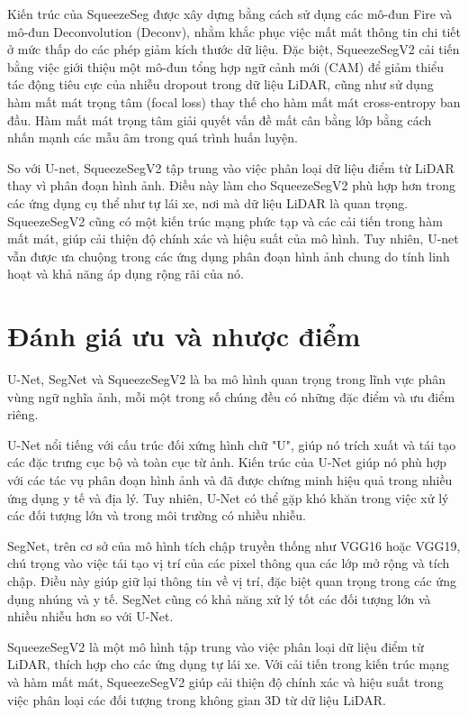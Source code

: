 Kiến trúc của SqueezeSeg được xây dựng bằng cách sử dụng các mô-đun Fire và mô-đun Deconvolution (Deconv), nhằm khắc phục việc mất mát thông tin chi tiết ở mức thấp do các phép giảm kích thước dữ liệu. Đặc biệt, SqueezeSegV2 cải tiến bằng việc giới thiệu một mô-đun tổng hợp ngữ cảnh mới (CAM) để giảm thiểu tác động tiêu cực của nhiễu dropout trong dữ liệu LiDAR, cũng như sử dụng hàm mất mát trọng tâm (focal loss) thay thế cho hàm mất mát cross-entropy ban đầu. Hàm mất mát trọng tâm giải quyết vấn đề mất cân bằng lớp bằng cách nhấn mạnh các mẫu âm trong quá trình huấn luyện.

So với U-net, SqueezeSegV2 tập trung vào việc phân loại dữ liệu điểm từ LiDAR thay vì phân đoạn hình ảnh. Điều này làm cho SqueezeSegV2 phù hợp hơn trong các ứng dụng cụ thể như tự lái xe, nơi mà dữ liệu LiDAR là quan trọng. SqueezeSegV2 cũng có một kiến trúc mạng phức tạp và các cải tiến trong hàm mất mát, giúp cải thiện độ chính xác và hiệu suất của mô hình. Tuy nhiên, U-net vẫn được ưa chuộng trong các ứng dụng phân đoạn hình ảnh chung do tính linh hoạt và khả năng áp dụng rộng rãi của nó.

\section{Đánh giá ưu và nhược điểm}
U-Net, SegNet và SqueezeSegV2 là ba mô hình quan trọng trong lĩnh vực phân vùng ngữ nghĩa ảnh, mỗi một trong số chúng đều có những đặc điểm và ưu điểm riêng.

U-Net nổi tiếng với cấu trúc đối xứng hình chữ "U", giúp nó trích xuất và tái tạo các đặc trưng cục bộ và toàn cục từ ảnh. Kiến trúc của U-Net giúp nó phù hợp với các tác vụ phân đoạn hình ảnh và đã được chứng minh hiệu quả trong nhiều ứng dụng y tế và địa lý. Tuy nhiên, U-Net có thể gặp khó khăn trong việc xử lý các đối tượng lớn và trong môi trường có nhiều nhiễu.

SegNet, trên cơ sở của mô hình tích chập truyền thống như VGG16 hoặc VGG19, chú trọng vào việc tái tạo vị trí của các pixel thông qua các lớp mở rộng và tích chập. Điều này giúp giữ lại thông tin về vị trí, đặc biệt quan trọng trong các ứng dụng nhúng và y tế. SegNet cũng có khả năng xử lý tốt các đối tượng lớn và nhiều nhiễu hơn so với U-Net.

SqueezeSegV2 là một mô hình tập trung vào việc phân loại dữ liệu điểm từ LiDAR, thích hợp cho các ứng dụng tự lái xe. Với cải tiến trong kiến trúc mạng và hàm mất mát, SqueezeSegV2 giúp cải thiện độ chính xác và hiệu suất trong việc phân loại các đối tượng trong không gian 3D từ dữ liệu LiDAR.

